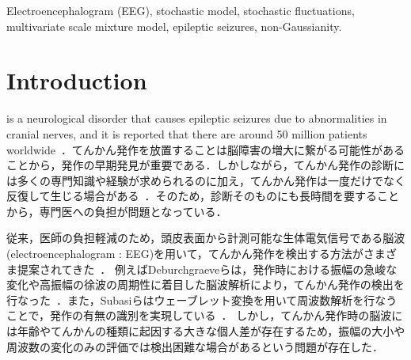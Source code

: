 \documentclass[journal]{IEEEtran}
\begin{document}
\begin{IEEEkeywords}
Electroencephalogram (EEG), stochastic model, stochastic fluctuations, multivariate scale mixture model, epileptic seizures, non-Gaussianity.
\end{IEEEkeywords}



%
\IEEEpeerreviewmaketitle



\section{Introduction}
%
%
%
%
 is a neurological disorder that causes epileptic seizures due to abnormalities in cranial nerves, and it is reported that there are around 50 million patients worldwide~\cite{WHO}．てんかん発作を放置することは脳障害の増大に繋がる可能性があることから，発作の早期発見が重要である．しかしながら，てんかん発作の診断には多くの専門知識や経験が求められるのに加え，てんかん発作は一度だけでなく反復して生じる場合がある~\cite{Kandel2000}．そのため，診断そのものにも長時間を要することから，専門医への負担が問題となっている．

従来，医師の負担軽減のため，頭皮表面から計測可能な生体電気信号である脳波(electroencephalogram : EEG)を用いて，てんかん発作を検出する方法がさまざま提案されてきた~\cite{Deburchgraeve2008,Subasi2005,kellaway1979precise,Panzica1999,fusco1993ictal,Acir2005,Greene2008}．
例えばDeburchgraeveらは，発作時における振幅の急峻な変化や高振幅の徐波の周期性に着目した脳波解析により，てんかん発作の検出を行なった~\cite{Deburchgraeve2008}．また，Subasiらはウェーブレット変換を用いて周波数解析を行なうことで，発作の有無の識別を実現している~\cite{Subasi2005}．
しかし，てんかん発作時の脳波には年齢やてんかんの種類に起因する大きな個人差が存在するため，振幅の大小や周波数の変化のみの評価では検出困難な場合があるという問題が存在した．
\end{document}
